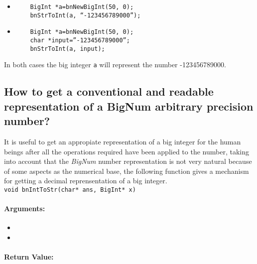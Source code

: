 \documentclass{book}
\begin{document}
\begin{itemize}
\item

\begin{verbatim}
	BigInt *a=bnNewBigInt(50, 0);
	bnStrToInt(a, “-123456789000”);
\end{verbatim}

\item

\begin{verbatim}
	BigInt *a=bnNewBigInt(50, 0);
	char *input=”-123456789000”;
	bnStrToInt(a, input);
\end{verbatim}
\end{itemize}

In both cases the big integer \verb+a+ will represent the number -123456789000.

\subsection{How to get a conventional and readable representation of a BigNum arbitrary precision number?}

It is useful to get an appropiate representation of a big integer for the human beings after all the operations required have been applied to the number, taking into account that the \emph{BigNum} number representation is not very natural because of some aspects as the numerical base, the following function gives a mechanism for getting a decimal reprensentation of a big integer.\\

\verb+void bnIntToStr(char* ans, BigInt* x)+\\

\paragraph{Arguments:}

\begin{itemize}
\item


\item 


\end{itemize}

\paragraph{Return Value:}
\end{document}
